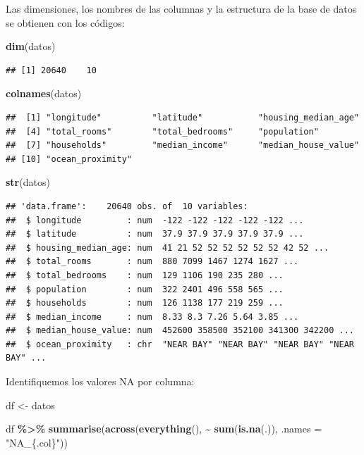 \documentclass[
]{book}
\newenvironment{Shaded}{\begin{snugshade}}{\end{snugshade}}
\newcommand{\AttributeTok}[1]{\textcolor[rgb]{0.13,0.29,0.53}{#1}}
\newcommand{\FunctionTok}[1]{\textcolor[rgb]{0.13,0.29,0.53}{\textbf{#1}}}
\newcommand{\NormalTok}[1]{#1}
\newcommand{\OtherTok}[1]{\textcolor[rgb]{0.56,0.35,0.01}{#1}}
\newcommand{\SpecialCharTok}[1]{\textcolor[rgb]{0.81,0.36,0.00}{\textbf{#1}}}
\newcommand{\StringTok}[1]{\textcolor[rgb]{0.31,0.60,0.02}{#1}}
\begin{document}
Las dimensiones, los nombres de las columnas y la estructura de la base de datos se obtienen con los códigos:

\begin{Shaded}
\begin{Highlighting}[]
\FunctionTok{dim}\NormalTok{(datos)}
\end{Highlighting}
\end{Shaded}

\begin{verbatim}
## [1] 20640    10
\end{verbatim}

\begin{Shaded}
\begin{Highlighting}[]
\FunctionTok{colnames}\NormalTok{(datos)}
\end{Highlighting}
\end{Shaded}

\begin{verbatim}
##  [1] "longitude"          "latitude"           "housing_median_age"
##  [4] "total_rooms"        "total_bedrooms"     "population"        
##  [7] "households"         "median_income"      "median_house_value"
## [10] "ocean_proximity"
\end{verbatim}

\begin{Shaded}
\begin{Highlighting}[]
\FunctionTok{str}\NormalTok{(datos)}
\end{Highlighting}
\end{Shaded}

\begin{verbatim}
## 'data.frame':    20640 obs. of  10 variables:
##  $ longitude         : num  -122 -122 -122 -122 -122 ...
##  $ latitude          : num  37.9 37.9 37.9 37.9 37.9 ...
##  $ housing_median_age: num  41 21 52 52 52 52 52 52 42 52 ...
##  $ total_rooms       : num  880 7099 1467 1274 1627 ...
##  $ total_bedrooms    : num  129 1106 190 235 280 ...
##  $ population        : num  322 2401 496 558 565 ...
##  $ households        : num  126 1138 177 219 259 ...
##  $ median_income     : num  8.33 8.3 7.26 5.64 3.85 ...
##  $ median_house_value: num  452600 358500 352100 341300 342200 ...
##  $ ocean_proximity   : chr  "NEAR BAY" "NEAR BAY" "NEAR BAY" "NEAR BAY" ...
\end{verbatim}

Identifiquemos los valores NA por columna:

\begin{Shaded}
\begin{Highlighting}[]
\NormalTok{df }\OtherTok{\textless{}{-}}\NormalTok{ datos}

\NormalTok{df }\SpecialCharTok{\%\textgreater{}\%}
    \FunctionTok{summarise}\NormalTok{(}\FunctionTok{across}\NormalTok{(}\FunctionTok{everything}\NormalTok{(), }\SpecialCharTok{\textasciitilde{}} \FunctionTok{sum}\NormalTok{(}\FunctionTok{is.na}\NormalTok{(.)), }\AttributeTok{.names =} \StringTok{"NA\_\{.col\}"}\NormalTok{))}
\end{Highlighting}
\end{Shaded}
\end{document}
